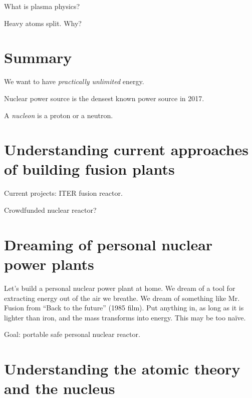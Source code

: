 What is plasma physics?

Heavy atoms split.
Why?

\section{Summary}

We want to have \emph{practically unlimited} energy.

Nuclear power source is the densest known power source in 2017.

A \emph{nucleon} is a proton or a neutron.

\section{Understanding current approaches of building fusion plants}


Current projects:
ITER fusion reactor.


Crowdfunded nuclear reactor?

\section{Dreaming of personal nuclear power plants}


Let's build a personal nuclear power plant at home.
We dream of a tool for extracting energy out of the air we breathe.
We dream of something like Mr. Fusion from \enquote{Back to the future} (1985 film).
Put anything in, as long as it is lighter than iron, and the mass transforms into energy.
This may be too na\"ive.



Goal:
portable safe personal nuclear reactor.

\section{Understanding the atomic theory and the nucleus}

